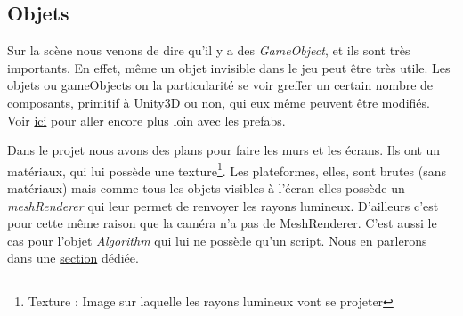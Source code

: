 \documentclass[a4paper,11pt]{myreport}
\begin{document}
	\newpage
	\subsection{Objets}
	\par Sur la scène nous venons de dire qu'il y a des \textit{GameObject}, et ils sont très importants. En effet, même un objet invisible dans le jeu peut être très utile.
	Les objets ou gameObjects on la particularité se voir greffer un certain nombre de composants, primitif à Unity3D ou non, qui eux même peuvent être modifiés. Voir \hyperlink{prefabTarget}{ici} pour aller encore plus loin avec les prefabs.

	\par Dans le projet nous avons des plans pour faire les murs et les écrans. Ils ont un matériaux, qui lui possède une texture\footnote{Texture : Image sur laquelle les rayons lumineux vont se projeter}. Les plateformes, elles, sont brutes (sans matériaux) mais comme tous les objets visibles à l'écran elles possède un \textit{meshRenderer} qui leur permet de renvoyer les rayons lumineux. D'ailleurs c'est pour cette même raison que la caméra n'a pas de MeshRenderer. C'est aussi le cas pour l'objet \textit{Algorithm} qui lui ne possède qu'un script. Nous en parlerons dans une \hyperlink{prefabTarget}{section} dédiée.
\end{document}
